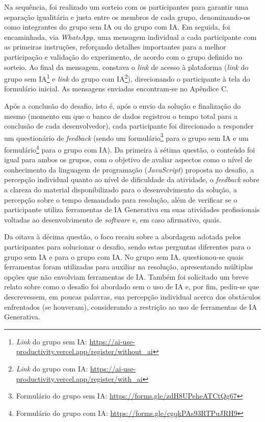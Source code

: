 \documentclass[english,brazilian]{UNISINOSartigo} %
\begin{document}
Na sequência, foi realizado um sorteio com os participantes para garantir uma separação igualitária e justa entre os membros de cada grupo, denominando-os como integrantes do grupo sem IA ou do grupo com IA. Em seguida, foi encaminhada, via \textit{WhatsApp}, uma mensagem individual a cada participante com as primeiras instruções, reforçando detalhes importantes para a melhor participação e validação do experimento, de acordo com o grupo definido no sorteio. Ao final da mensagem, constava o \textit{link} de acesso à plataforma (\textit{link} do grupo sem IA\footnote{\textit{Link} do grupo sem IA: \url{https://ai-use-productivity.vercel.app/register/without_ai}} e \textit{link} do grupo com IA\footnote{\textit{Link} do grupo com IA: \url{https://ai-use-productivity.vercel.app/register/with_ai}}), direcionando o participante à tela do formulário inicial. As mensagens enviadas encontram-se no Apêndice C.

Após a conclusão do desafio, isto é, após o envio da solução e finalização do mesmo (momento em que o banco de dados registrou o tempo total para a conclusão de cada desenvolvedor), cada participante foi direcionado a responder um questionário de \textit{feedback} (sendo um formulário\footnote{Formulário do grupo sem IA: \url{https://forms.gle/zdH8UPeheATCtQg67}} para o grupo sem IA e um formulário\footnote{Formulário do grupo com IA: \url{https://forms.gle/cgqkPAs93RTPuJRH9}} para o grupo com IA). Da primeira à sétima questão, o conteúdo foi igual para ambos os grupos, com o objetivo de avaliar aspectos como o nível de conhecimento da linguagem de programação (\textit{JavaScript}) proposta no desafio, a percepção individual quanto ao nível de dificuldade da atividade, o \textit{feedback} sobre a clareza do material disponibilizado para o desenvolvimento da solução, a percepção sobre o tempo demandado para resolução, além de verificar se o participante utiliza ferramentas de IA Generativa em suas atividades profissionais voltadas ao desenvolvimento de \textit{software} e, em caso afirmativo, quais.

Da oitava à décima questão, o foco recaiu sobre a abordagem adotada pelos participantes para solucionar o desafio, sendo estas perguntas diferentes para o grupo sem IA e para o grupo com IA. No grupo sem IA, questionou-se quais ferramentas foram utilizadas para auxiliar na resolução, apresentando múltiplas opções que não envolviam ferramentas de IA. Também foi solicitado um breve relato sobre como o desafio foi abordado sem o uso de IA e, por fim, pediu-se que descrevessem, em poucas palavras, sua percepção individual acerca dos obstáculos enfrentados (se houveram), considerando a restrição ao uso de ferramentas de IA Generativa.
\end{document}
